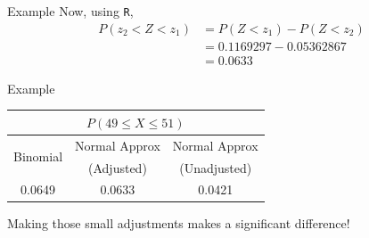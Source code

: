 \begin{frame}{Example}
    Now, using \texttt{R}, 
    \begin{align*}
        P(z_2 < Z < z_1) &= P(Z<z_1)-P(Z<z_2) \\
        &= 0.1169297 - 0.05362867 \\
        &= 0.0633
    \end{align*}
\end{frame}

\begin{frame}{Example}
    \begin{center}
        \begin{tabular}{|c|c|c|}
            \hline
            \multicolumn{3}{|c|}{$P(49 \le X \le 51)$} \\ \hline
            \multirow{2}{*}{Binomial} & Normal Approx  & Normal Approx  \\
            & (Adjusted) & (Unadjusted) \\ \hline
            0.0649 & 0.0633 & 0.0421 \\ \hline
        \end{tabular}
    \end{center}
    Making those small adjustments makes a significant difference!
\end{frame}